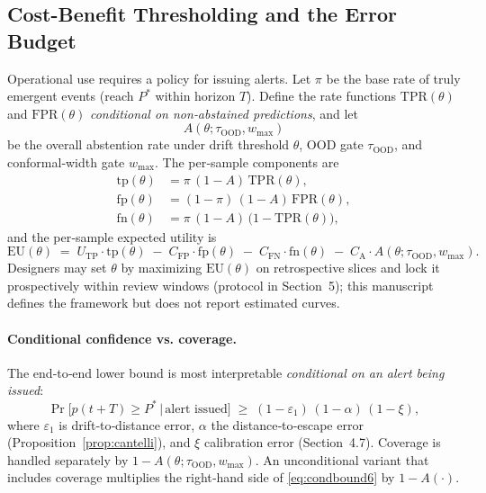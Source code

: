 \documentclass[11pt]{article}
\begin{document}
\subsection{Cost-Benefit Thresholding and the Error Budget}
\label{sec:cost-benefit}
Operational use requires a policy for issuing alerts. Let $\pi$ be the base rate of truly emergent events (reach $P^{*}$ within horizon $T$). Define the rate functions $\mathrm{TPR}(\theta)$ and $\mathrm{FPR}(\theta)$ \emph{conditional on non‑abstained predictions}, and let
\[
A(\theta;\tau_{\text{OOD}},w_{\max})
\]
be the overall abstention rate under drift threshold $\theta$, OOD gate $\tau_{\text{OOD}}$, and conformal‑width gate $w_{\max}$. The per‑sample components are
\begin{align}
\mathrm{tp}(\theta) &= \pi\,(1-A)\,\mathrm{TPR}(\theta), \\
\mathrm{fp}(\theta) &= (1-\pi)\,(1-A)\,\mathrm{FPR}(\theta), \\
\mathrm{fn}(\theta) &= \pi\,(1-A)\,\big(1-\mathrm{TPR}(\theta)\big),
\end{align}
and the per‑sample expected utility is
\begin{equation}
\mathrm{EU}(\theta) \;=\; U_{\mathrm{TP}}\cdot \mathrm{tp}(\theta) \;-\; C_{\mathrm{FP}}\cdot \mathrm{fp}(\theta) \;-\; C_{\mathrm{FN}}\cdot \mathrm{fn}(\theta) \;-\; C_{\mathrm{A}}\cdot A(\theta;\tau_{\text{OOD}},w_{\max}).
\end{equation}
Designers may set $\theta$ by maximizing $\mathrm{EU}(\theta)$ on retrospective slices and lock it prospectively within review windows (protocol in Section~5); this manuscript defines the framework but does not report estimated curves.

\paragraph{Conditional confidence vs. coverage.}
The end‑to‑end lower bound is most interpretable \emph{conditional on an alert being issued}:
\begin{equation}
\label{eq:condbound6}
\Pr\!\big[p(t{+}T)\ge P^* \,\big|\, \text{alert issued}\big] \;\ge\; (1-\varepsilon_1)\,(1-\alpha)\,(1-\xi),
\end{equation}
where $\varepsilon_1$ is drift‑to‑distance error, $\alpha$ the distance‑to‑escape error (Proposition~\ref{prop:cantelli}), and $\xi$ calibration error (Section~4.7). Coverage is handled separately by $1-A(\theta;\tau_{\text{OOD}},w_{\max})$. An unconditional variant that includes coverage multiplies the right‑hand side of \eqref{eq:condbound6} by $1-A(\cdot)$.
\end{document}
